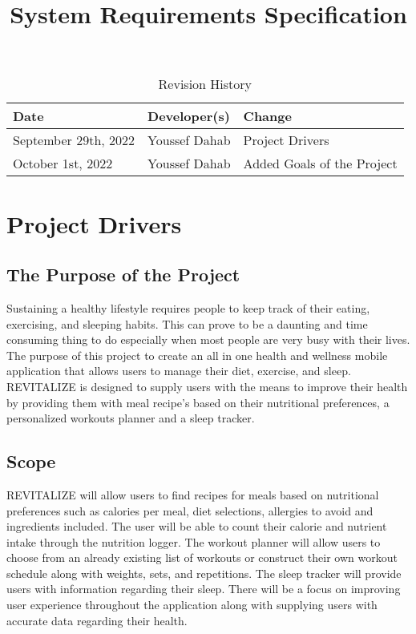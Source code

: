 \documentclass[12pt,letterpaper]{article}
\title{System Requirements Specification\\\progname}
\author{\authname}
\date{}
\begin{document}
\maketitle

\begin{table}[hp]
	\caption{Revision History} \label{TblRevisionHistory}
	\begin{tabularx}{\textwidth}{llX}
		\toprule
		\textbf{Date} & \textbf{Developer(s)} & \textbf{Change}\\
		\midrule
		September 29th, 2022 & Youssef Dahab & Project Drivers \\
		October 1st, 2022 & Youssef Dahab & Added Goals of the Project \\
		\bottomrule
	\end{tabularx}
\end{table}

\newpage
\tableofcontents
\newpage

\section{Project Drivers}

\subsection{The Purpose of the Project}
Sustaining a healthy lifestyle requires people to keep track of their eating, exercising, and sleeping habits. This can prove to be a daunting and time consuming thing to do especially when most people are very busy with their lives. The purpose of this project to create an all in one health and wellness mobile application that allows users to manage their diet, exercise, and sleep. REVITALIZE is designed to supply users with the means to improve their health by providing them with meal recipe's based on their nutritional preferences, a personalized workouts planner and a sleep tracker. 

\subsection{Scope}
REVITALIZE will allow users to find recipes for meals based on nutritional preferences such as calories per meal, diet selections, allergies to avoid and ingredients included. The user will be able to count their calorie and nutrient intake through the nutrition logger. The workout planner will allow users to choose from an already existing list of workouts or construct their own workout schedule along with weights, sets, and repetitions. The sleep tracker will provide users with information regarding their sleep. There will be a focus on improving user experience throughout the application along with supplying users with accurate data regarding their health.
\end{document}
